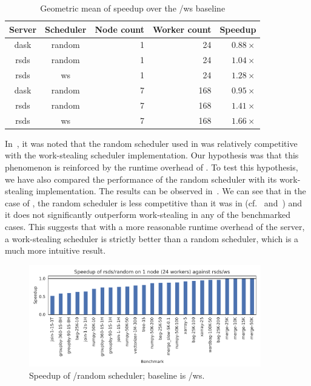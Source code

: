 \setlength{\tabcolsep}{5pt}
\begin{table}
	\centering
	\begin{tabular}{c|c|r|r|r}
		\textbf{Server} & \textbf{Scheduler} & \textbf{Node count} & \textbf{Worker	count} &
		\textbf{Speedup}                                                                                 \\
		\midrule
		dask            & random             & 1                   & 24                   & $0.88\times$ \\
		rsds            & random             & 1                   & 24                   & $1.04\times$ \\
		rsds            & ws                 & 1                   & 24                   & $1.28\times$ \\
		dask            & random             & 7                   & 168                  & $0.95\times$ \\
		rsds            & random             & 7                   & 168                  & $1.41\times$ \\
		rsds            & ws                 & 7                   & 168                  & $1.66\times$ \\
	\end{tabular}
	\caption{Geometric mean of speedup over the \dask{}/ws baseline}
	\label{tab:rsds-geom-mean-speedup}
\end{table}

In~, it was noted that the random scheduler used in
\dask{} was relatively competitive with the work-stealing scheduler
implementation. Our hypothesis was that this phenomenon is reinforced by the runtime overhead of
\dask{}. To test this hypothesis, we have also compared the performance of the
\rsds{} random scheduler with its work-stealing implementation. The results can
be observed in~. We can see that in the case of
\rsds{}, the random scheduler is less competitive than it was in
\dask{} (cf.~ and~) and it does not significantly outperform work-stealing in any of the
benchmarked cases. This suggests that with a more reasonable runtime overhead of the server, a
work-stealing scheduler is strictly better than a random scheduler, which is a much more intuitive
result.

\begin{figure}
	\centering
	\includegraphics[width=0.9\textwidth]{./imgs/rsds/charts/speedup-rsds-random-1-baseline-rsds-ws}
	\caption{Speedup of \rsds{}/random scheduler; baseline is \rsds{}/ws.}
	\label{fig:rsds-random-baseline}
\end{figure}

